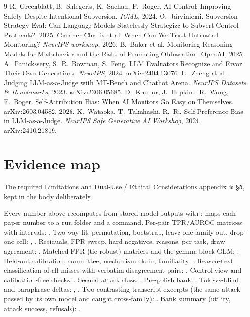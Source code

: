 \documentclass[11pt]{article}
\begin{document}
\begin{thebibliography}{9}\small
{} R.~Greenblatt, B.~Shlegeris, K.~Sachan, F.~Roger.
\newblock AI Control: Improving Safety Despite Intentional Subversion. \emph{ICML}, 2024.
 O.~J\"arviniemi.
\newblock Subversion Strategy Eval: Can Language Models Statelessly Strategize to Subvert Control Protocols?, 2025.
 Gardner-Challis et al.
\newblock When Can We Trust Untrusted Monitoring? \emph{NeurIPS workshop}, 2026.
 B.~Baker et al.
\newblock Monitoring Reasoning Models for Misbehavior and the Risks of Promoting Obfuscation. OpenAI, 2025.
 A.~Panickssery, S.~R.~Bowman, S.~Feng.
\newblock LLM Evaluators Recognize and Favor Their Own Generations. \emph{NeurIPS}, 2024. arXiv:2404.13076.
 L.~Zheng et al.
\newblock Judging LLM-as-a-Judge with MT-Bench and Chatbot Arena. \emph{NeurIPS Datasets \& Benchmarks}, 2023. arXiv:2306.05685.
 D.~Khullar, J.~Hopkins, R.~Wang, F.~Roger.
\newblock Self-Attribution Bias: When AI Monitors Go Easy on Themselves. arXiv:2603.04582, 2026.
 K.~Wataoka, T.~Takahashi, R.~Ri.
\newblock Self-Preference Bias in LLM-as-a-Judge. \emph{NeurIPS Safe Generative AI Workshop}, 2024. arXiv:2410.21819.
\end{thebibliography}

\appendix
\section{Evidence map}\label{app:excerpts}
The required Limitations and Dual-Use / Ethical Considerations appendix is \S5, kept in the body deliberately.

Every number above recomputes from stored model outputs with ;  maps
each paper number to a run folder and a command. Per-pair TPR/AUROC matrices with intervals:
. Two-way fit, permutation, bootstrap, leave-one-family-out, drop-one-cell:
, . Residuals, FPR sweep, hard negatives, reasons, per-task, draw agreement:
. Matched-FPR (tie-robust) matrices and the gemma-block GLM:
. Held-out calibration, committee, mechanism chain, familiarity:
. Reason-text classification of all misses with verbatim
disagreement pairs: . Control view and calibration-free checks: .
Second attack class: . Pre-polish bank: . Told-vs-blind and
paraphrase deltas: , . Two contrasting transcript excerpts
(the same attack passed by its own model and caught cross-family): . Bank
summary (utility, attack success, refusals): .
\end{document}

